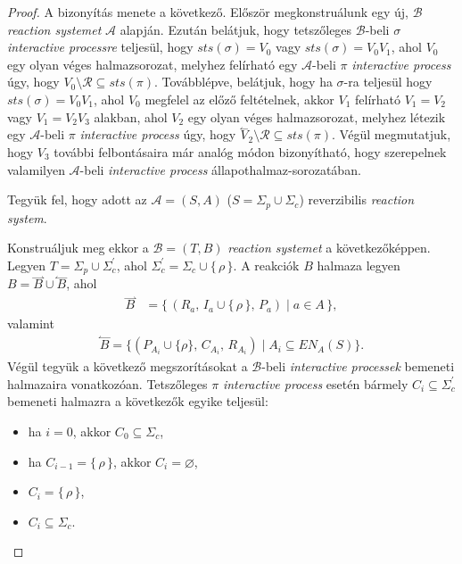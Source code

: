 \documentclass[12pt]{article}
\theoremstyle{definition}
\theoremstyle{remark}
\theoremstyle{plain}
\theoremstyle{plain}
\let\emptyset\varnothing
\newcommand{\forwardhat}{\overset{\rightharpoonup}}
\newcommand{\backwardhat}{\overset{\leftharpoonup}}
\newcommand{\reaction}[3]{
    (#1, \, #2, \, #3)
}
\begin{document}
    \begin{proof}
        A bizonyítás menete a következő. Először megkonstruálunk egy új, $\mathscr{B}$ \textit{reaction systemet} $\mathscr{A}$ alapján. Ezután belátjuk, hogy tetszőleges $\mathscr{B}$-beli $\sigma$ \textit{interactive processre} teljesül, hogy $\textit{sts}(\sigma)=V_{0}$ vagy $\textit{sts}(\sigma)=V_{0}V_{1}$, ahol $V_{0}$ egy olyan véges halmazsorozat, melyhez felírható egy $\mathscr{A}$-beli $\pi$ \textit{interactive process} úgy, hogy $V_{0} \setminus \mathcal{R} \subseteq \textit{sts}(\pi)$. Továbblépve, belátjuk, hogy ha $\sigma$-ra teljesül hogy $\textit{sts}(\sigma)=V_{0}V_{1}$, ahol $V_{0}$ megfelel az előző feltételnek, akkor $V_{1}$ felírható $V_{1}=V_{2}$ vagy $V_{1}=V_{2}V_{3}$ alakban, ahol $V_{2}$ egy olyan véges halmazsorozat, melyhez létezik egy $\mathscr{A}$-beli $\pi$ \textit{interactive process} úgy, hogy $\backwardhat V_{2} \setminus \mathcal{R} \subseteq \textit{sts}(\pi)$. Végül megmutatjuk, hogy $V_{3}$ további felbontásaira már analóg módon bizonyítható, hogy szerepelnek valamilyen $\mathscr{A}$-beli \textit{interactive process} állapothalmaz-sorozatában.

        Tegyük fel, hogy adott az $\mathscr{A} = (S, A)$ ($S = \Sigma_{p} \cup \Sigma_{c}$) reverzibilis \textit{reaction system}.
        
        Konstruáljuk meg ekkor a $\mathscr{B} = (T, B)$ \textit{reaction systemet} a következőképpen. Legyen $T = \Sigma_{p} \cup \Sigma^{\prime}_{c}$, ahol $\Sigma^{\prime}_{c} = \Sigma_{c} \cup \{ \, \rho \, \}$. A reakciók $B$ halmaza legyen $B = \forwardhat B \cup \backwardhat B$, ahol
        \begin{align*}
            \forwardhat B &= \{ \, \reaction{R_{a}}{I_{a} \cup \{ \, \rho \, \}}{P_{a}} \;|\; a \in A \, \},
        \end{align*}
        valamint
        \begin{align*}
            \backwardhat B = \{ \reaction{P_{A_{i}} \cup \{ \rho \}}{C_{A_{i}}}{R_{A_{i}}} \;|\; A_{i} \subseteq \textit{EN}_{A}(S) \}.
        \end{align*}
        Végül tegyük a következő megszorításokat a $\mathscr{B}$-beli \textit{interactive processek} bemeneti halmazaira vonatkozóan. Tetszőleges $\pi$ \textit{interactive process} esetén bármely $C_{i} \subseteq \Sigma^{\prime}_{c}$ bemeneti halmazra a következők egyike teljesül:
        \begin{itemize}
            \item
            ha $i = 0$, akkor $C_{0} \subseteq \Sigma_{c}$,
            \item
            ha $C_{i - 1} = \{\, \rho \,\}$, akkor $C_{i} = \emptyset$,
            \item    
            $C_{i} = \{\, \rho \,\}$,
            \item
            $C_{i} \subseteq \Sigma_{c}$.            
        \end{itemize}


\end{proof}
\end{document}
